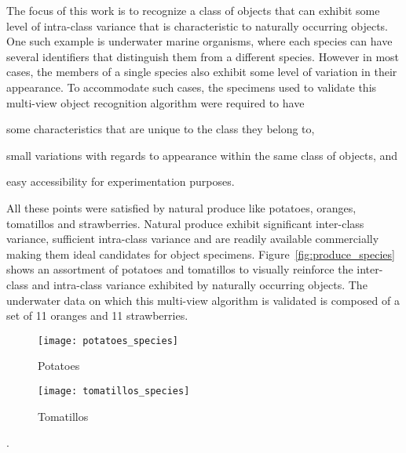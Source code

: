 The focus of this work is to recognize a class of objects that can exhibit some level of intra-class variance that is characteristic to naturally occurring objects. One such example is underwater marine organisms, where each species can have several identifiers that distinguish them from a different species. However in most cases, the members of a single species also exhibit some level of variation in their appearance. To accommodate such cases, the specimens used to validate this multi-view object recognition algorithm were required to have \begin{enumerate*}[label=(\roman*)]  \item some characteristics that are unique to the class they belong to, \item small variations with regards to appearance within the same class of objects, and \item easy accessibility for experimentation purposes. \end{enumerate*} All these points were satisfied by natural produce like potatoes, oranges, tomatillos and strawberries. Natural produce exhibit significant inter-class variance, sufficient intra-class variance and are 
readily 
available commercially making them ideal 
candidates for object specimens. Figure~\ref{fig:produce_species} shows an assortment of potatoes and tomatillos to visually reinforce the inter-class and intra-class variance exhibited by naturally occurring objects. The underwater data on which this multi-view algorithm is validated is composed of a set of 11 oranges and 11 strawberries.
%
\begin{figure*}
  \centering
  \begin{subfigure}[]{0.45\textwidth}
      \texttt{[image: potatoes\_species]}
      \caption{Potatoes}
      \label{fig:potato_species}
  \end{subfigure}
  \begin{subfigure}[]{0.45\textwidth}
      \texttt{[image: tomatillos\_species]}
      \caption{Tomatillos}
      \label{fig:tomatillo_species}
  \end{subfigure}
\caption[Illustration of the inter-class and intra-class variance exhibited by naturally occurring objects]
{An illustration of the inter-class and intra-class variance exhibited by naturally occurring objects like 
potatoes () and tomatillos ()}.
\label{fig:produce_species}
\end{figure*}	
%
